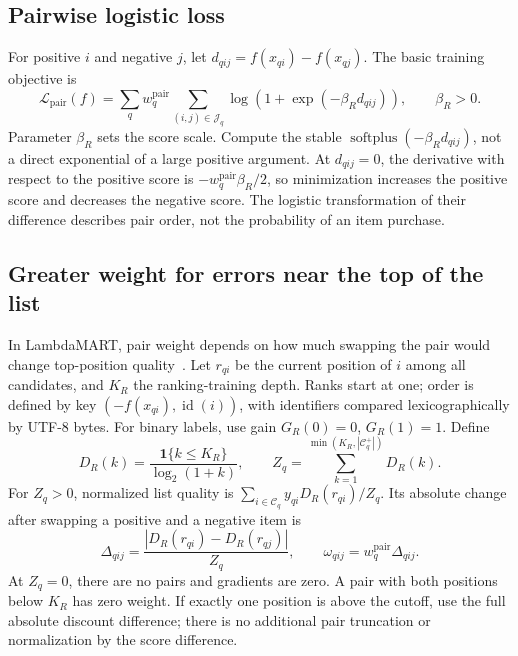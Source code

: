 \documentclass[12pt,a4paper]{article}
\newcommand{\ind}{\mathbf 1}
\theoremstyle{plainru}
\begin{document}
\subsection{Pairwise logistic loss}

For positive $i$ and negative $j$, let
$d_{qij}=f(x_{qi})-f(x_{qj})$.
The basic training objective is
\begin{equation}\label{eq:model-pairwise-loss}
\mathcal L_{\mathrm{pair}}(f)=
\sum_q w_q^{\mathrm{pair}}\sum_{(i,j)\in\mathcal J_q}
\log\!\left(1+\exp(-\beta_R d_{qij})\right),
\qquad \beta_R>0.
\end{equation}
Parameter $\beta_R$ sets the score scale.
Compute the stable $\operatorname{softplus}(-\beta_Rd_{qij})$,
not a direct exponential of a large positive argument.
At $d_{qij}=0$, the derivative with respect to the positive score is
$-w_q^{\mathrm{pair}}\beta_R/2$, so minimization increases the positive score
and decreases the negative score. The logistic transformation of their difference
describes pair order, not the probability of an item purchase.

\subsection{Greater weight for errors near the top of the list}

In LambdaMART, pair weight depends on how much swapping the pair
would change top-position quality~\cite{lambdamart}.
Let $r_{qi}$ be the current position of $i$ among all candidates,
and $K_R$ the ranking-training depth. Ranks start at one;
order is defined by key $(-f(x_{qi}),\operatorname{id}(i))$,
with identifiers compared lexicographically by UTF-8 bytes.
For binary labels, use gain $G_R(0)=0$, $G_R(1)=1$.
Define
\begin{equation}\label{eq:model-rank-discount}
D_R(k)=\frac{\ind\{k\le K_R\}}{\log_2(1+k)},\qquad
Z_q=\sum_{k=1}^{\min(K_R,|\mathcal C_q^+|)}D_R(k).
\end{equation}
For $Z_q>0$, normalized list quality is
$\sum_{i\in\mathcal C_q}y_{qi}D_R(r_{qi})/Z_q$.
Its absolute change after swapping a positive and a negative
item is
\begin{equation}\label{eq:model-lambda-weight}
\Delta_{qij}=
\frac{|D_R(r_{qi})-D_R(r_{qj})|}{Z_q},\qquad
\omega_{qij}=w_q^{\mathrm{pair}}\Delta_{qij}.
\end{equation}
At $Z_q=0$, there are no pairs and gradients are zero.
A pair with both positions below $K_R$ has zero weight. If exactly one
position is above the cutoff, use the full absolute discount difference;
there is no additional pair truncation or normalization by the score
difference.
\end{document}
